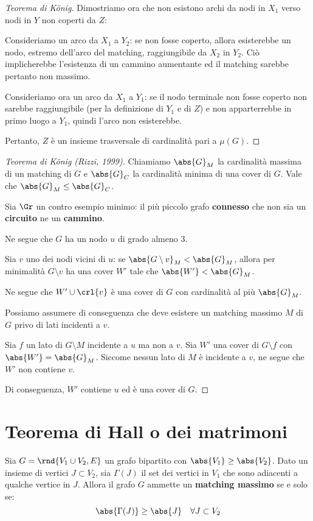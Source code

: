 \documentclass[\main/main.tex]{subfiles}
\begin{document}
\begin{proof}[Teorema di König]
	Dimostriamo ora che non esistono archi da nodi in \(X_1\) verso nodi in \(Y\) non coperti da \(Z\):

	Consideriamo un arco da \(X_1\) a \(Y_2\): se non fosse coperto, allora esisterebbe un nodo, estremo dell'arco del matching, raggiungibile da \(X_2\) in \(Y_2\). Ciò implicherebbe l'esistenza di un cammino aumentante ed il matching sarebbe pertanto non massimo.

	Consideriamo ora un arco da \(X_1\) a \(Y_1\): se il nodo terminale non fosse coperto non sarebbe raggiungibile (per la definizione di \(Y_1\) e di \(Z\)) e non apparterrebbe in primo luogo a \(Y_1\), quindi l'arco non esisterebbe.

	Pertanto, \(Z\) è un insieme trasversale di cardinalità pari a \(\mu(G)\).
\end{proof}

\begin{proof}[Teorema di König (Rizzi, 1999)]
	Chiamiamo \(\abs{G}_M\) la cardinalità massima di un matching di \(G\) e \(\abs{G}_C\) la cardinalità minima di una cover di \(G\). Vale che \(\abs{G}_M \leq \abs{G}_C\).

	Sia \(\Gr \) un contro esempio minimo: il più piccolo grafo \textbf{connesso} che non sia un \textbf{circuito} ne un \textbf{cammino}.

	Ne segue che \(G\) ha un nodo \(u\) di grado almeno \(3\).

	Sia \(v\) uno dei nodi vicini di \(u\): se \(\abs{G\setminus v}_M < \abs{G}_M\), allora per minimalità \(G \setminus v\) ha una cover \(W'\) tale che \(\abs{W'} < \abs{G}_M\).

	Ne segue che \(W' \cup \crl{v}\) è una cover di \(G\) con cardinalità al più \(\abs{G}_M\).

	Possiamo assumere di conseguenza che deve esistere un matching massimo \(M\) di \(G\) privo di lati incidenti a \(v\).

	Sia \(f\) un lato di \(G\setminus M\) incidente a \(u\) ma non a \(v\). Sia \(W'\) una cover di \(G\setminus f\) con \(\abs{W'} = \abs{G}_M\). Siccome nessun lato di \(M\) è incidente a \(v\), ne segue che \(W'\) non contiene \(v\).

	Di conseguenza, \(W'\) contiene \(u\) ed è una cover di \(G\).
\end{proof}
\clearpage
\section{Teorema di Hall o dei matrimoni}
\begin{theorem}
	Sia \(G = \rnd{V_1 \cup V_2, E}\) un grafo bipartito con \(\abs{V_1} \geq \abs{V_2}\). Dato un insieme di vertici \(J \subset V_2\), sia \(\Gamma(J) \) il set dei vertici in \(V_1\) che sono adiacenti a qualche vertice in \(J\). Allora il grafo \(G\) ammette un \textbf{matching massimo} se e solo se:
	\[
		\abs{\Gamma(J)} \geq \abs{J} \quad \forall J \subset V_2
	\]
\end{theorem}
\end{document}
